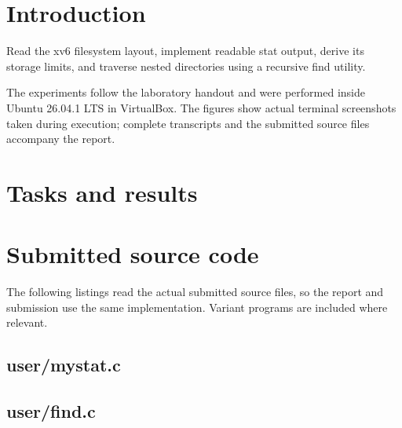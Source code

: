 \documentclass{tum_report}
\begin{document}

\tableofcontents
\thispagestyle{empty}
\clearpage
\chapter{Introduction}
Read the xv6 filesystem layout, implement readable stat output, derive its storage limits, and traverse nested directories using a recursive find utility.

The experiments follow the laboratory handout and were performed inside Ubuntu 26.04.1 LTS in VirtualBox. The figures show actual terminal screenshots taken during execution; complete transcripts and the submitted source files accompany the report.
\chapter{Tasks and results}

\clearpage

\par\vspace{0.8cm}

\clearpage
\appendix
\chapter{Submitted source code}
The following listings read the actual submitted source files, so the report and submission use the same implementation. Variant programs are included where relevant.
\Needspace{450pt}
\section{user/mystat.c}

\section{user/find.c}

\end{document}
